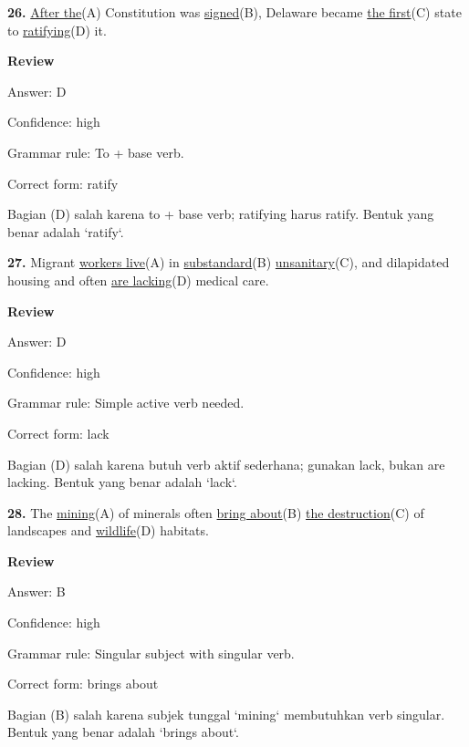 \documentclass[12pt]{article}
\begin{document}
\endgroup
\par
\vspace{\questionblockgap}
\noindent\textbf{26.} \uline{After the}(A) Constitution was \uline{signed}(B), Delaware became \uline{the first}(C) state to \uline{ratifying}(D) it.
\par
\begingroup
\setlength{\parskip}{0pt}
\setlength{\parindent}{0pt}
\textbf{Review}\par
Answer: D\par
Confidence: high\par
Grammar rule: To + base verb.\par
Correct form: ratify\par
Bagian (D) salah karena to + base verb; ratifying harus ratify. Bentuk yang benar adalah `ratify`.\par
\endgroup
\par
\vspace{\questionblockgap}
\noindent\textbf{27.} Migrant \uline{workers live}(A) in \uline{substandard}(B) \uline{unsanitary}(C), and dilapidated housing and often \uline{are lacking}(D) medical care.
\par
\begingroup
\setlength{\parskip}{0pt}
\setlength{\parindent}{0pt}
\textbf{Review}\par
Answer: D\par
Confidence: high\par
Grammar rule: Simple active verb needed.\par
Correct form: lack\par
Bagian (D) salah karena butuh verb aktif sederhana; gunakan lack, bukan are lacking. Bentuk yang benar adalah `lack`.\par
\endgroup
\par
\vspace{\questionblockgap}
\noindent\textbf{28.} The \uline{mining}(A) of minerals often \uline{bring about}(B) \uline{the destruction}(C) of landscapes and \uline{wildlife}(D) habitats.
\par
\begingroup
\setlength{\parskip}{0pt}
\setlength{\parindent}{0pt}
\textbf{Review}\par
Answer: B\par
Confidence: high\par
Grammar rule: Singular subject with singular verb.\par
Correct form: brings about\par
Bagian (B) salah karena subjek tunggal `mining` membutuhkan verb singular. Bentuk yang benar adalah `brings about`.\par
\end{document}
